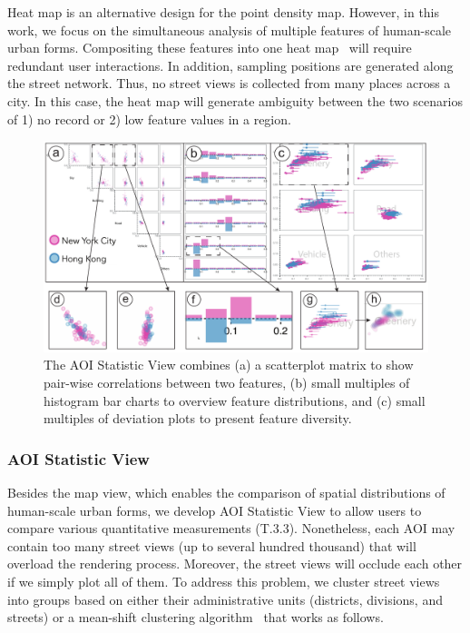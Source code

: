 Heat map is an alternative design for the point density map.
However, in this work, we focus on the simultaneous analysis of multiple features of human-scale urban forms.
Compositing these features into one heat map~\cite{scheepens_2011_composite} will require redundant user interactions.
In addition, sampling positions are generated along the street network.
Thus, no street views is collected from many places across a city.
In this case, the heat map will generate ambiguity between the two scenarios of 1) no record or 2) low feature values in a region.

\begin{figure}[t]
	\centering
	\includegraphics[width=0.85\columnwidth]{figure/streetvizor/fig5_statistic_view/statistic_view}
	\vspace{-4mm}
	\caption{The AOI Statistic View combines (a) a scatterplot matrix to show pair-wise correlations between two features, (b) small multiples of histogram bar charts to overview feature distributions, and (c) small multiples of deviation plots to present feature diversity. }
	\label{fig:c1_statistic_view}
	\vspace{-4mm}
\end{figure}

\subsubsection{AOI Statistic View}
\label{sssec:c1_statistic_view}
Besides the map view, which enables the comparison of spatial distributions of human-scale urban forms, we develop AOI Statistic View to allow users to compare various quantitative measurements (T.3.3).
Nonetheless, each AOI may contain too many street views (up to several hundred thousand) that will overload the rendering process.
Moreover, the street views will occlude each other if we simply plot all of them.
To address this problem, we cluster street views into groups based on either their administrative units (districts, divisions, and streets) or a mean-shift clustering algorithm~\cite{comaniciu_2002_meanshift} that works as follows.
 
